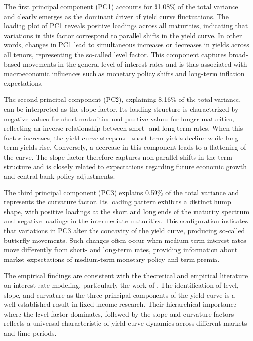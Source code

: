 The first principal component (PC1) accounts for 91.08\% of the total variance and clearly emerges as the dominant driver of yield curve fluctuations. The loading plot of PC1 reveals positive loadings across all maturities, indicating that variations in this factor correspond to parallel shifts in the yield curve. In other words, changes in PC1 lead to simultaneous increases or decreases in yields across all tenors, representing the so-called level factor. This component captures broad-based movements in the general level of interest rates and is thus associated with macroeconomic influences such as monetary policy shifts and long-term inflation expectations.

The second principal component (PC2), explaining 8.16\% of the total variance, can be interpreted as the slope factor. Its loading structure is characterized by negative values for short maturities and positive values for longer maturities, reflecting an inverse relationship between short- and long-term rates. When this factor increases, the yield curve steepens—short-term yields decline while long-term yields rise. Conversely, a decrease in this component leads to a flattening of the curve. The slope factor therefore captures non-parallel shifts in the term structure and is closely related to expectations regarding future economic growth and central bank policy adjustments.

The third principal component (PC3) explains 0.59\% of the total variance and represents the curvature factor. Its loading pattern exhibits a distinct hump shape, with positive loadings at the short and long ends of the maturity spectrum and negative loadings in the intermediate maturities. This configuration indicates that variations in PC3 alter the concavity of the yield curve, producing so-called butterfly movements. Such changes often occur when medium-term interest rates move differently from short- and long-term rates, providing information about market expectations of medium-term monetary policy and term premia.

The empirical findings are consistent with the theoretical and empirical literature on interest rate modeling, particularly the work of \parencite[pp.~98--107]{Rebonato_2018}. The identification of level, slope, and curvature as the three principal components of the yield curve is a well-established result in fixed-income research. Their hierarchical importance—where the level factor dominates, followed by the slope and curvature factors—reflects a universal characteristic of yield curve dynamics across different markets and time periods.

